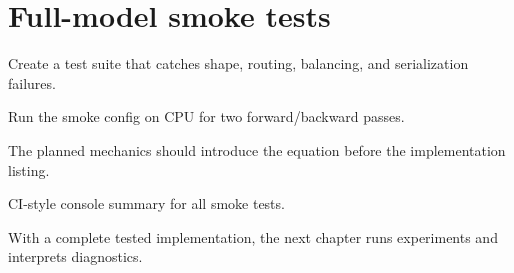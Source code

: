 \section{Full-model smoke tests}
\label{sec:ch10-full-model-smoke-tests}

Create a test suite that catches shape, routing, balancing, and serialization failures.



Run the smoke config on CPU for two forward/backward passes.



The planned mechanics should introduce the equation before the implementation listing.





\begin{checkpointbox}
CI-style console summary for all smoke tests.
\end{checkpointbox}

With a complete tested implementation, the next chapter runs experiments and interprets diagnostics.
